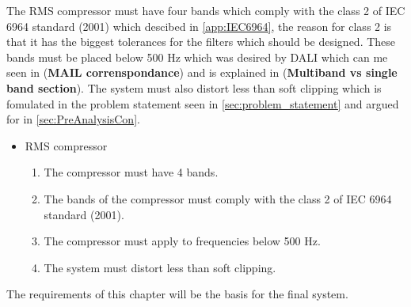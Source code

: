 The RMS compressor must have four bands which comply with the class 2 of IEC 6964 standard (2001) which descibed in \autoref{app:IEC6964}, the reason for class 2 is that it has the biggest tolerances for the filters which should be designed. These bands must be placed below 500 Hz which was desired by DALI which can me seen in (\textbf{MAIL correnspondance}) and is explained in (\textbf{Multiband vs single band section}). The system must also distort less than soft clipping which is fomulated in the problem statement seen in \autoref{sec:problem_statement} and argued for in \autoref{sec:PreAnalysisCon}.

\begin{itemize}
\item RMS compressor
\begin{enumerate}
\item [\textlabel{8}{bands}] The compressor must have 4 bands.\\
\item [\textlabel{9}{standardband}] The bands of the compressor must comply with the class 2 of IEC 6964 standard (2001).\\
\item [\textlabel{10}{500below}] The compressor must apply to frequencies below 500 Hz.\\
\item [\textlabel{11}{softclipping}] The system must distort less than soft clipping.
\end{enumerate}
\end{itemize}

The requirements of this chapter will be the basis for the final system.



